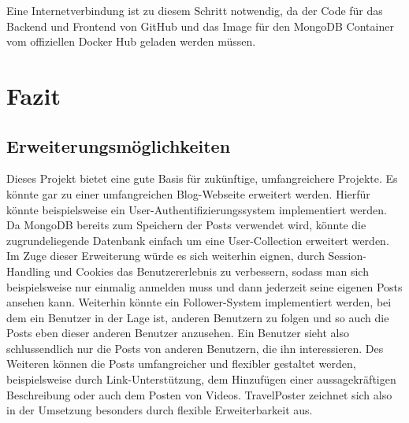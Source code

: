 \documentclass[12pt,a4paper]{report}
\begin{document}
Eine Internetverbindung ist zu diesem Schritt notwendig, da der Code für das Backend und Frontend von GitHub und das Image für den MongoDB Container vom offiziellen Docker Hub geladen werden müssen.

\newpage
\chapter{Fazit}
\section{Erweiterungsmöglichkeiten}
Dieses Projekt bietet eine gute Basis für zukünftige, umfangreichere Projekte. Es könnte gar zu einer umfangreichen Blog-Webseite erweitert werden. Hierfür könnte beispielsweise ein User-Authentifizierungssystem implementiert werden. Da MongoDB bereits zum Speichern der Posts verwendet wird, könnte die zugrundeliegende Datenbank einfach um eine User-Collection erweitert werden. Im Zuge dieser Erweiterung würde es sich weiterhin eignen, durch Session-Handling und Cookies das Benutzererlebnis zu verbessern, sodass man sich beispielsweise nur einmalig anmelden muss und dann jederzeit seine eigenen Posts ansehen kann. Weiterhin könnte ein Follower-System implementiert werden, bei dem ein Benutzer in der Lage ist, anderen Benutzern zu folgen und so auch die Posts eben dieser anderen Benutzer anzusehen. Ein Benutzer sieht also schlussendlich nur die Posts von anderen Benutzern, die ihn interessieren.
Des Weiteren können die Posts umfangreicher und flexibler gestaltet werden, beispielsweise durch Link-Unterstützung, dem Hinzufügen einer aussagekräftigen Beschreibung oder auch dem Posten von Videos. TravelPoster zeichnet sich also in der Umsetzung besonders durch flexible Erweiterbarkeit aus.


%
\end{document}
